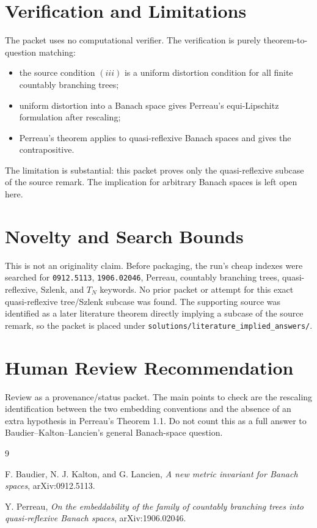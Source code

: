 \documentclass[11pt]{article}
\begin{document}
\section*{Verification and Limitations}

The packet uses no computational verifier. The verification is purely
theorem-to-question matching:
\begin{itemize}
  \item the source condition $(iii)$ is a uniform distortion condition for all
  finite countably branching trees;
  \item uniform distortion into a Banach space gives Perreau's
  equi-Lipschitz formulation after rescaling;
  \item Perreau's theorem applies to quasi-reflexive Banach spaces and gives
  the contrapositive.
\end{itemize}

The limitation is substantial: this packet proves only the quasi-reflexive
subcase of the source remark. The implication for arbitrary Banach spaces is
left open here.

\section*{Novelty and Search Bounds}

This is not an originality claim. Before packaging, the run's cheap indexes
were searched for \texttt{0912.5113}, \texttt{1906.02046}, Perreau,
countably branching trees, quasi-reflexive, Szlenk, and $T_N$ keywords. No
prior packet or attempt for this exact quasi-reflexive tree/Szlenk subcase was
found. The supporting source was identified as a later literature theorem
directly implying a subcase of the source remark, so the packet is placed under
\texttt{solutions/literature\_implied\_answers/}.

\section*{Human Review Recommendation}

Review as a provenance/status packet. The main points to check are the
rescaling identification between the two embedding conventions and the absence
of an extra hypothesis in Perreau's Theorem 1.1. Do not count this as a full
answer to Baudier--Kalton--Lancien's general Banach-space question.

\begin{thebibliography}{9}

F. Baudier, N. J. Kalton, and G. Lancien,
\emph{A new metric invariant for Banach spaces},
arXiv:0912.5113.

Y. Perreau,
\emph{On the embeddability of the family of countably branching trees into
quasi-reflexive Banach spaces},
arXiv:1906.02046.

\end{thebibliography}
\end{document}
